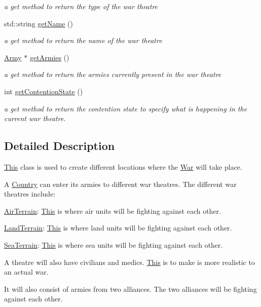 \begin{DoxyCompactItemize}
\begin{DoxyCompactList}\small\item\em a get method to return the type of the war theatre \end{DoxyCompactList}\item 
std\+::string \mbox{\hyperlink{class_war_theatre_a4ecfdcdbc85833b4be2f69df2c0ed195}{get\+Name}} ()
\begin{DoxyCompactList}\small\item\em a get method to return the name of the war theatre \end{DoxyCompactList}\item 
\mbox{\hyperlink{class_army}{Army}} $\ast$ \mbox{\hyperlink{class_war_theatre_abddee7212b4e178eaf1923664411b0cb}{get\+Armies}} ()
\begin{DoxyCompactList}\small\item\em a get method to return the armies currently present in the war theatre \end{DoxyCompactList}\item 
int \mbox{\hyperlink{class_war_theatre_ab40e687f758e22fdf56e962df1ce58ee}{get\+Contention\+State}} ()
\begin{DoxyCompactList}\small\item\em a get method to return the contention state to specify what is happening in the current war theatre. \end{DoxyCompactList}\end{DoxyCompactItemize}


\subsection{Detailed Description}
\mbox{\hyperlink{class_this}{This}} class is used to create different locations where the \mbox{\hyperlink{class_war}{War}} will take place.
\begin{DoxyItemize}
\item A \mbox{\hyperlink{class_country}{Country}} can enter its armies to different war theatres. The different war theatres include\+:
\begin{DoxyItemize}
\item \mbox{\hyperlink{class_air_terrain}{Air\+Terrain}}\+: \mbox{\hyperlink{class_this}{This}} is where air units will be fighting against each other.
\item \mbox{\hyperlink{class_land_terrain}{Land\+Terrain}}\+: \mbox{\hyperlink{class_this}{This}} is where land units will be fighting against each other.
\item \mbox{\hyperlink{class_sea_terrain}{Sea\+Terrain}}\+: \mbox{\hyperlink{class_this}{This}} is where sea units will be fighting against each other.
\end{DoxyItemize}
\item A theatre will also have civilians and medics. \mbox{\hyperlink{class_this}{This}} is to make is more realistic to an actual war.
\item It will also consist of armies from two alliances. The two alliances will be fighting against each other.
\end{DoxyItemize}

